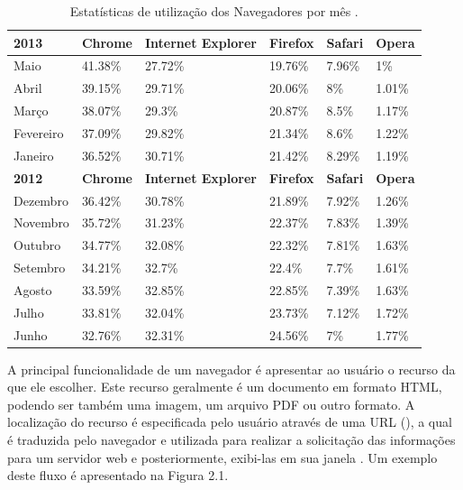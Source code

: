 \documentclass[espaco=simples,appendix=Name]{abnt}
\begin{document}
\begin{table}[ht]
	\centering
	\caption{Estatísticas de utilização dos Navegadores por mês \cite{BrowserStats}.
	\label{tbl:padc}}{
		\vspace{0.4cm}
		\begin{tabular}{|l|l|l|l|l|l|}
	    	\hline
			\textbf{2013} & \textbf{Chrome} & \textbf{Internet Explorer} &\textbf{Firefox} & \textbf{Safari} & \textbf{Opera} \\
			\hline
			Maio		& 41.38\%	&	27.72\%	&	19.76\%	&	7.96\%	&	1\%		\\
			\hline
			Abril		& 39.15\%	&	29.71\%	&	20.06\%	&	8\%		&	1.01\%	\\
			\hline
			Março		& 38.07\%	&	29.3\%	&	20.87\%	&	8.5\%	&	1.17\%	\\
			\hline
			Fevereiro	& 37.09\%	&	29.82\%	&	21.34\%	&	8.6\%	&	1.22\%	\\
			\hline
			Janeiro		& 36.52\%	&	30.71\%	&	21.42\%	&	8.29\%	&	1.19\%	\\
			\hline
			
			\textbf{2012} & \textbf{Chrome} & \textbf{Internet Explorer} &\textbf{Firefox} & \textbf{Safari} & \textbf{Opera} \\
			\hline
			Dezembro	& 36.42\%	&	30.78\%	&	21.89\%	&	7.92\%	&	1.26\%	\\
			\hline
			Novembro	& 35.72\%	&	31.23\%	&	22.37\%	&	7.83\%	&	1.39\%	\\
			\hline
			Outubro		& 34.77\%	&	32.08\%	&	22.32\%	&	7.81\%	&	1.63\%	\\
			\hline
			Setembro	& 34.21\%	&	32.7\%	&	22.4\%	&	7.7\%	&	1.61\%	\\
			\hline
			Agosto		& 33.59\%	&	32.85\%	&	22.85\%	&	7.39\%	&	1.63\%	\\
			\hline
			Julho		& 33.81\%	&	32.04\%	&	23.73\%	&	7.12\%	&	1.72\%	\\
			\hline
			Junho		& 32.76\%	&	32.31\%	&	24.56\%	&	7\%		&	1.77\%	\\
		\end{tabular}
		}
\end{table}

A principal funcionalidade de um navegador é apresentar ao usuário o recurso da  que ele escolher. Este  recurso geralmente é um documento em formato HTML, podendo ser também uma imagem, um arquivo PDF ou outro formato. A localização do recurso é especificada pelo usuário através de uma URL (), a qual é traduzida pelo navegador e utilizada para realizar a solicitação das informações para um servidor web e posteriormente, exibi-las em sua janela \cite{ArchitectureWebBrowsers}. Um exemplo deste fluxo é apresentado na Figura 2.1.
\end{document}
